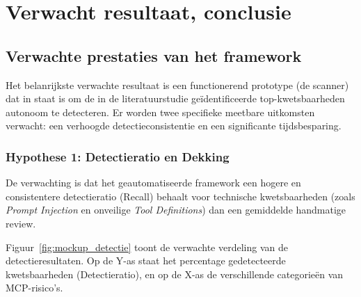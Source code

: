 \section{Verwacht resultaat, conclusie}%
\label{sec:verwachte_resultaten}

\subsection{Verwachte prestaties van het framework}

Het belanrijkste verwachte resultaat is een functionerend prototype (de scanner) dat in staat is om de in de literatuurstudie geïdentificeerde top-kwetsbaarheden autonoom te detecteren. Er worden twee specifieke meetbare uitkomsten verwacht: een verhoogde detectieconsistentie en een significante tijdsbesparing.

\subsubsection{Hypothese 1: Detectieratio en Dekking}
De verwachting is dat het geautomatiseerde framework een hogere en consistentere detectieratio (Recall) behaalt voor technische kwetsbaarheden (zoals \emph{Prompt Injection} en onveilige \emph{Tool Definitions}) dan een gemiddelde handmatige review.

Figuur~\ref{fig:mockup_detectie} toont de verwachte verdeling van de detectieresultaten. Op de Y-as staat het percentage gedetecteerde kwetsbaarheden (Detectieratio), en op de X-as de verschillende categorieën van MCP-risico's.

